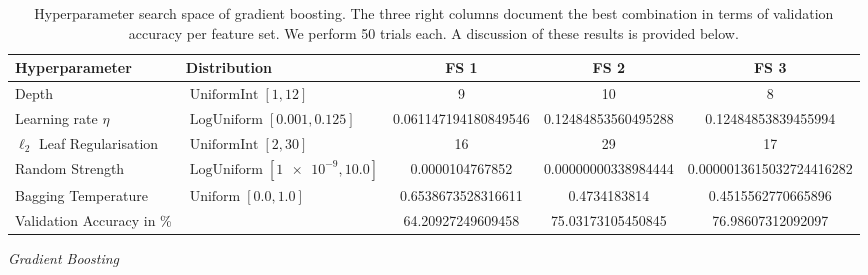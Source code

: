 \begin{table}[H]
    \centering
    \caption[Hyperparameter Search Space of Gradient Boosting]{Hyperparameter search space of gradient boosting. The three right columns document the best combination in terms of validation accuracy per feature set. We perform \num{50} trials each. A discussion of these results is provided below.}
    \label{tab:hyperparameter-space}
    \begin{tabular}{@{}llSSS@{}}
        \toprule
        Hyperparameter                    & Distribution                              & {FS 1}           & {FS 2}               & {FS 3}            \\ \midrule
        Depth                        & $\operatorname{UniformInt}[1,12]$         & 9                       & 10                          & 8                        \\
        Learning rate $\eta$         & $\operatorname{LogUniform}[0.001, 0.125]$ & 0.061147194180849546    & 0.12484853560495288         & 0.12484853839455994      \\
        $\ell_2$ Leaf Regularisation & $\operatorname{UniformInt}[2, 30]$        & 16                      & 29                          & 17                       \\
        Random Strength              & $\operatorname{LogUniform}[\num{1e-9}, 10.0]$ & 0.0000104767852 & 0.00000000338984444 & 0.0000013615032724416282 \\
        Bagging Temperature          & $\operatorname{Uniform}[0.0, 1.0]$        & 0.6538673528316611      & 0.4734183814        & 0.4515562770665896       \\ \midrule
        Validation Accuracy in \%            &                                           & 64.20927249609458    & 75.03173105450845         & 76.98607312092097 \\ \bottomrule
    \end{tabular}
\end{table}

\emph{Gradient Boosting}

